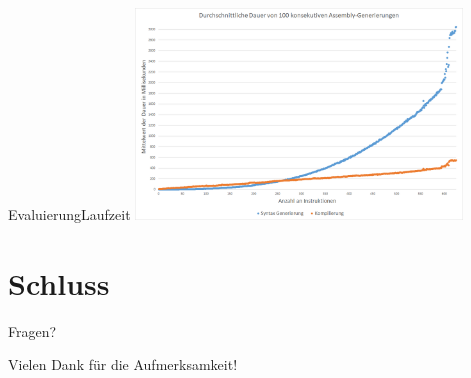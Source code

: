 \documentclass[t,aspectratio=169,divpsnames]{beamer}
\begin{document}
\begin{frame}{Evaluierung}{Laufzeit}
	\center
	\includegraphics[width=0.65\textwidth]{img/AverageTimeDiagram2.png}
\end{frame}

\section*{Schluss}
\begin{frame}
	\begin{center}
		\Huge{Fragen?}
	\end{center}
\end{frame}

\begin{frame}
	\begin{center}
		\Huge{Vielen Dank für die Aufmerksamkeit!}
	\end{center}
\end{frame}

\begin{frame}[allowframebreaks]{\bibname}
\end{frame}
\end{document}
